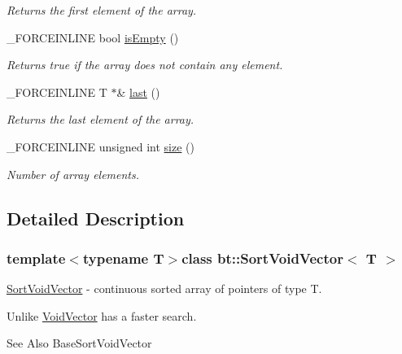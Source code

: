 \begin{DoxyCompactItemize}
\begin{DoxyCompactList}\small\item\em Returns the first element of the array. \end{DoxyCompactList}\item 
\hypertarget{classbt_1_1_sort_void_vector_a6bb2a2d3d4369361bbf4cfd150932f5c}{\-\_\-\-F\-O\-R\-C\-E\-I\-N\-L\-I\-N\-E bool \hyperlink{classbt_1_1_sort_void_vector_a6bb2a2d3d4369361bbf4cfd150932f5c}{is\-Empty} ()}\label{classbt_1_1_sort_void_vector_a6bb2a2d3d4369361bbf4cfd150932f5c}

\begin{DoxyCompactList}\small\item\em Returns true if the array does not contain any element. \end{DoxyCompactList}\item 
\hypertarget{classbt_1_1_sort_void_vector_ac3f2a4c481c97e5510aa046d8585eb51}{\-\_\-\-F\-O\-R\-C\-E\-I\-N\-L\-I\-N\-E T $\ast$\& \hyperlink{classbt_1_1_sort_void_vector_ac3f2a4c481c97e5510aa046d8585eb51}{last} ()}\label{classbt_1_1_sort_void_vector_ac3f2a4c481c97e5510aa046d8585eb51}

\begin{DoxyCompactList}\small\item\em Returns the last element of the array. \end{DoxyCompactList}\item 
\hypertarget{classbt_1_1_sort_void_vector_a688aff324d888892b04a73ebad2aa0ec}{\-\_\-\-F\-O\-R\-C\-E\-I\-N\-L\-I\-N\-E unsigned int \hyperlink{classbt_1_1_sort_void_vector_a688aff324d888892b04a73ebad2aa0ec}{size} ()}\label{classbt_1_1_sort_void_vector_a688aff324d888892b04a73ebad2aa0ec}

\begin{DoxyCompactList}\small\item\em Number of array elements. \end{DoxyCompactList}\end{DoxyCompactItemize}


\subsection{Detailed Description}
\subsubsection*{template$<$typename T$>$class bt\-::\-Sort\-Void\-Vector$<$ T $>$}

\hyperlink{classbt_1_1_sort_void_vector}{Sort\-Void\-Vector} -\/ continuous sorted array of pointers of type T. 

Unlike \hyperlink{classbt_1_1_void_vector}{Void\-Vector} has a faster search.

\begin{DoxySeeAlso}{See Also}
Base\-Sort\-Void\-Vector 
\end{DoxySeeAlso}
